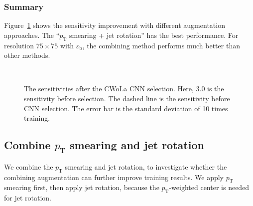 \documentclass[12pt]{article}
\begin{document}
		\subsubsection{Summary}%
		\label{subs:summary}
			Figure~\ref{fig:sensitivity_improvement_summary_aug_SB_3} shows the sensitivity improvement with different augmentation approaches. The ``$p_{\text{T}}$ smearing + jet rotation'' has the best performance. For resolution $75\times 75$ with $\varepsilon_{\text{b}}$, the combining method performs much better than other methods.
			\begin{figure}[htpb]
				\centering
				 \\
				\caption{The sensitivities after the CWoLa CNN selection. Here, $3.0$ is the sensitivity before selection. The dashed line is the sensitivity before CNN selection. The error bar is the standard deviation of 10 times training.}
				\label{fig:sensitivity_improvement_summary_aug_SB_3}
			\end{figure}
	\subsection{Combine \texorpdfstring{$p_{\mathrm{T}}$}{pT} smearing and jet rotation}%
	\label{sub:combine_pt_smearing_and_jet_rotation}
		We combine the $p_{\text{T}}$ smearing and jet rotation, to investigate whether the combining augmentation can further improve training results. We apply $p_{\text{T}}$ smearing first, then apply jet rotation, because the $p_{\text{T}}$-weighted center is needed for jet rotation.
\end{document}

